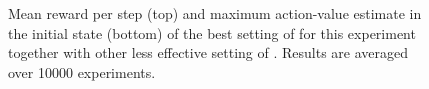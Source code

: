 \documentclass[conference]{IEEEtran}
\begin{document}
\begin{figure}[t]
\begin{minipage}{\columnwidth}
\end{minipage}
  \caption{Mean reward per step (top) and maximum action-value estimate in the initial state (bottom) of the best setting of \alg for this experiment together with other less effective setting of \alg. Results are averaged over 10000 experiments.}
  \label{F:hasselt_QDecs}
\end{figure}

\begin{figure}[t]
\begin{minipage}{\textwidth}
\centering

\end{minipage}
\end{figure}
\end{document}
